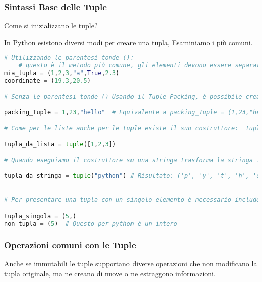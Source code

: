 \subsubsection{Sintassi Base delle Tuple}\label{SintassiTuple}

Come si inizializzano le tuple?

In Python esistono diversi modi per creare una tupla, Esaminiamo i più comuni.



\begin{lstlisting}[language=Python]
# Utilizzando le parentesi tonde ():
    # questo è il metodo più comune, gli elementi devono essere separati da virgole.
mia_tupla = (1,2,3,"a",True,2.3)
coordinate = (19.3,20.5)

# Senza le parentesi tonde () Usando il Tuple Packing, è possibile creare una tupla omettendo le parentesi, assegnando una sequenza di valori separati da virgola, in questo modo Python interpreterà automaticamente come tuple.

packing_Tuple = 1,23,"hello"  # Equivalente a packing_Tuple = (1,23,"hello")

# Come per le liste anche per le tuple esiste il suo costruttore:  tuple(), ma ha una sintassi leggermente diversa.

tupla_da_lista = tuple([1,2,3])

# Quando eseguiamo il costruttore su una stringa trasforma la stringa in un oggetto iterabile, del tutto simile a ciò che avviene con le liste.

tupla_da_stringa = tuple("python") # Risultato: ('p', 'y', 't', 'h', 'o', 'n')


# Per presentare una tupla con un singolo elemento è necessario includere una virgola finale dopo l'elemento. Altrimenti Python interpreterà l'espressione come il tipo dell'elemento stesso racchiuso tra parentesi (ad esempio, un intero, una stringa)

tupla_singola = (5,)
non_tupla = (5)  # Questo per python è un intero

\end{lstlisting}

\subsubsection{Operazioni comuni con le Tuple}\label{OperationBaseTuple}

Anche se immutabili le tuple supportano diverse operazioni che non modificano la tupla originale, ma ne creano di nuove o ne estraggono informazioni.

